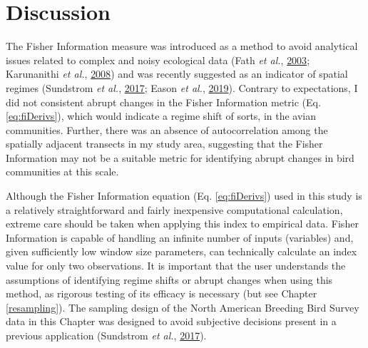 \documentclass[print]{nuthesis}
\begin{document}
\hypertarget{discussion-2}{%
\section{Discussion}\label{discussion-2}}

The Fisher Information measure was introduced as a method to avoid analytical issues related to complex and noisy ecological data (Fath \emph{et al.}, \protect\hyperlink{ref-fath_regime_2003}{2003}; Karunanithi \emph{et al.}, \protect\hyperlink{ref-karunanithi_detection_2008}{2008}) and was recently suggested as an indicator of spatial regimes (Sundstrom \emph{et al.}, \protect\hyperlink{ref-sundstrom2017detecting}{2017}; Eason \emph{et al.}, \protect\hyperlink{ref-eason2019information}{2019}). Contrary to expectations, I did not consistent abrupt changes in the Fisher Information metric (Eq. \eqref{eq:fiDerivs}), which would indicate a regime shift of sorts, in the avian communities. Further, there was an absence of autocorrelation among the spatially adjacent transects in my study area, suggesting that the Fisher Information may not be a suitable metric for identifying abrupt changes in bird communities at this scale.

Although the Fisher Information equation (Eq. \eqref{eq:fiDerivs}) used in this study is a relatively straightforward and fairly inexpensive computational calculation, extreme care should be taken when applying this index to empirical data. Fisher Information is capable of handling an infinite number of inputs (variables) and, given sufficiently low window size parameters, can technically calculate an index value for only two observations. It is important that the user understands the assumptions of identifying regime shifts or abrupt changes when using this method, as rigorous testing of its efficacy is necessary (but see Chapter \ref{resampling}). The sampling design of the North American Breeding Bird Survey data in this Chapter was designed to avoid subjective decisions present in a previous application (Sundstrom \emph{et al.}, \protect\hyperlink{ref-sundstrom2017detecting}{2017}).
\end{document}
